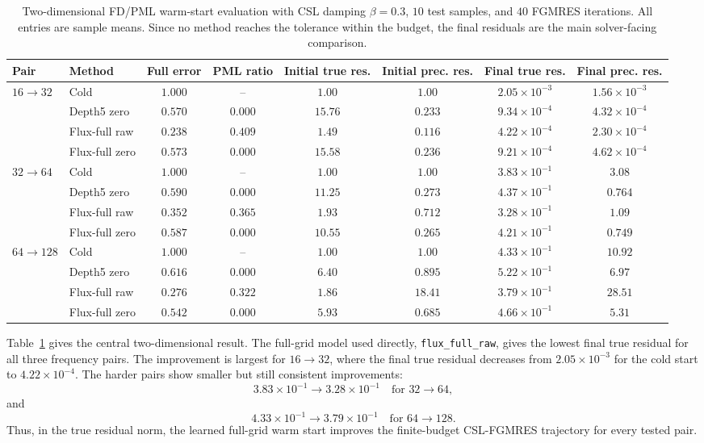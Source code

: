 \begin{table}[htbp]
\centering
\caption{Two-dimensional FD/PML warm-start evaluation with CSL damping
$\beta=0.3$, $10$ test samples, and $40$ FGMRES iterations. All entries are
sample means. Since no method reaches the tolerance within the budget, the
final residuals are the main solver-facing comparison.}
\label{tab:results-2d-beta03-precond}
\begin{adjustbox}{max width=\textwidth}
\begin{tabular}{llcccccc}
\toprule
Pair & Method & Full error & PML ratio
& Initial true res. & Initial prec. res.
& Final true res. & Final prec. res. \\
\midrule
$16\to32$ & Cold
& $1.000$ & -- & $1.00$ & $1.00$
& $2.05{\times}10^{-3}$ & $1.56{\times}10^{-3}$ \\
& Depth5 zero
& $0.570$ & $0.000$ & $15.76$ & $0.233$
& $9.34{\times}10^{-4}$ & $4.32{\times}10^{-4}$ \\
& Flux-full raw
& $0.238$ & $0.409$ & $1.49$ & $0.116$
& $4.22{\times}10^{-4}$ & $2.30{\times}10^{-4}$ \\
& Flux-full zero
& $0.573$ & $0.000$ & $15.58$ & $0.236$
& $9.21{\times}10^{-4}$ & $4.62{\times}10^{-4}$ \\
\midrule
$32\to64$ & Cold
& $1.000$ & -- & $1.00$ & $1.00$
& $3.83{\times}10^{-1}$ & $3.08$ \\
& Depth5 zero
& $0.590$ & $0.000$ & $11.25$ & $0.273$
& $4.37{\times}10^{-1}$ & $0.764$ \\
& Flux-full raw
& $0.352$ & $0.365$ & $1.93$ & $0.712$
& $3.28{\times}10^{-1}$ & $1.09$ \\
& Flux-full zero
& $0.587$ & $0.000$ & $10.55$ & $0.265$
& $4.21{\times}10^{-1}$ & $0.749$ \\
\midrule
$64\to128$ & Cold
& $1.000$ & -- & $1.00$ & $1.00$
& $4.33{\times}10^{-1}$ & $10.92$ \\
& Depth5 zero
& $0.616$ & $0.000$ & $6.40$ & $0.895$
& $5.22{\times}10^{-1}$ & $6.97$ \\
& Flux-full raw
& $0.276$ & $0.322$ & $1.86$ & $18.41$
& $3.79{\times}10^{-1}$ & $28.51$ \\
& Flux-full zero
& $0.542$ & $0.000$ & $5.93$ & $0.685$
& $4.66{\times}10^{-1}$ & $5.31$ \\
\bottomrule
\end{tabular}
\end{adjustbox}
\end{table}

Table~\ref{tab:results-2d-beta03-precond} gives the central
two-dimensional result. The full-grid model used directly,
\texttt{flux\_full\_raw}, gives the lowest final true residual for all three
frequency pairs. The improvement is largest for $16\to32$, where the final
true residual decreases from $2.05\times10^{-3}$ for the cold start to
$4.22\times10^{-4}$. The harder pairs show smaller but still consistent
improvements:
\[
    3.83\times10^{-1} \to 3.28\times10^{-1}
    \quad\text{for }32\to64,
\]
and
\[
    4.33\times10^{-1} \to 3.79\times10^{-1}
    \quad\text{for }64\to128.
\]
Thus, in the true residual norm, the learned full-grid warm start improves the
finite-budget CSL-FGMRES trajectory for every tested pair.

